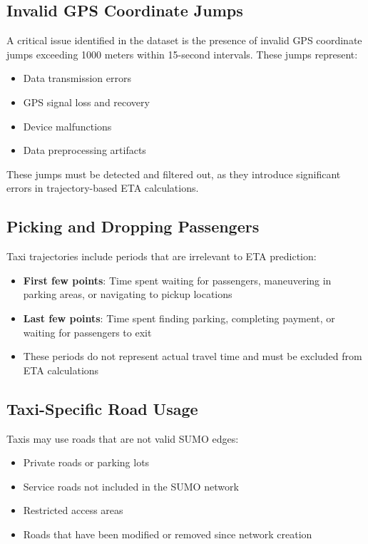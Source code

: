 \documentclass[11pt,a4paper]{article}
\begin{document}
\subsection{Invalid GPS Coordinate Jumps}

A critical issue identified in the dataset is the presence of invalid GPS coordinate jumps exceeding 1000 meters within 15-second intervals. These jumps represent:
\begin{itemize}
    \item Data transmission errors
    \item GPS signal loss and recovery
    \item Device malfunctions
    \item Data preprocessing artifacts
\end{itemize}

These jumps must be detected and filtered out, as they introduce significant errors in trajectory-based ETA calculations.

\subsection{Picking and Dropping Passengers}

Taxi trajectories include periods that are irrelevant to ETA prediction:
\begin{itemize}
    \item \textbf{First few points}: Time spent waiting for passengers, maneuvering in parking areas, or navigating to pickup locations
    \item \textbf{Last few points}: Time spent finding parking, completing payment, or waiting for passengers to exit
    \item These periods do not represent actual travel time and must be excluded from ETA calculations
\end{itemize}

\subsection{Taxi-Specific Road Usage}

Taxis may use roads that are not valid SUMO edges:
\begin{itemize}
    \item Private roads or parking lots
    \item Service roads not included in the SUMO network
    \item Restricted access areas
    \item Roads that have been modified or removed since network creation
\end{itemize}
\end{document}
